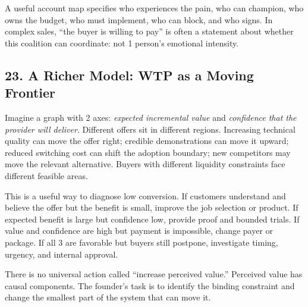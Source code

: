 A useful account map specifies who experiences the pain, who can champion, who owns the budget, who must implement, who can block, and who signs. In complex sales, ``the buyer is willing to pay'' is often a statement about whether this coalition can coordinate: not 1 person's emotional intensity.

\subsection*{23. A Richer Model: WTP as a Moving Frontier}

Imagine a graph with 2 axes: \emph{expected incremental value} and \emph{confidence that the provider will deliver}. Different offers sit in different regions. Increasing technical quality can move the offer right; credible demonstrations can move it upward; reduced switching cost can shift the adoption boundary; new competitors may move the relevant alternative. Buyers with different liquidity constraints face different feasible areas.

This is a useful way to diagnose low conversion. If customers understand and believe the offer but the benefit is small, improve the job selection or product. If expected benefit is large but confidence low, provide proof and bounded trials. If value and confidence are high but payment is impossible, change payer or package. If all 3 are favorable but buyers still postpone, investigate timing, urgency, and internal approval.

There is no universal action called ``increase perceived value.'' Perceived value has causal components. The founder's task is to identify the binding constraint and change the smallest part of the system that can move it.
